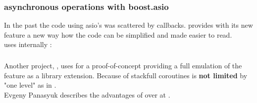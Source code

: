 \subsubsection*{asynchronous operations with boost.asio}
In the past the code using asio's \asyncops was scattered by callbacks.
\boostasio provides with its new feature \asyncres a new way how the code can be
simplified and made easier to read.\\
\yieldcontext uses internally \boostcoroutine:

\subsubsection*{\csharp \await}
Another project, \awaitemu, uses \boostcoroutine for a proof-of-concept
providing a full emulation of the \csharp feature \await as a library
extension. Because of stackfull coroutines \await is \textbf{not limited} by
"one level" as in \csharp.\\
Evgeny Panasyuk describes the advantages of \boostcoroutine over \await at
\channelnine.
